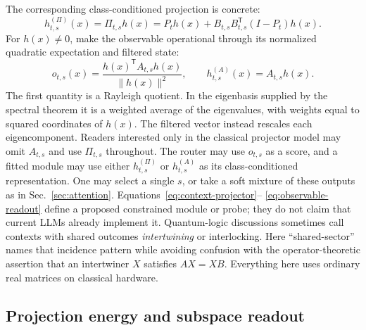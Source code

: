 \documentclass[
  aps,
  reprint,
  superscriptaddress,
  floatfix,
  nofootinbib,
  longbibliography
]{revtex4-2}
\newcommand{\T}{^{\mathsf{T}}}
\newcommand{\norm}[1]{\lVert #1 \rVert}
\begin{document}
The corresponding class-conditioned projection is concrete:
%
\begin{equation}
\label{eq:observable-embedding}
h_{t,s}^{(\Pi)}(x)
=\Pi_{t,s}h(x)
=P_t h(x)+B_{t,s}B_{t,s}\T(I-P_t)h(x).
\end{equation}
%
For $h(x)\ne0$, make the observable operational through its normalized
quadratic expectation and filtered state:
\begin{equation}
\label{eq:observable-readout}
o_{t,s}(x)=
\frac{h(x)\T A_{t,s}h(x)}{\norm{h(x)}^2},
\qquad
h_{t,s}^{(A)}(x)=A_{t,s}h(x).
\end{equation}
The first quantity is a Rayleigh quotient.  In the eigenbasis supplied by the
spectral theorem it is a weighted average of the eigenvalues, with weights
equal to squared coordinates of $h(x)$.  The filtered vector instead rescales
each eigencomponent.  Readers interested only in the classical projector
model may omit $A_{t,s}$ and use $\Pi_{t,s}$ throughout.
The router may use $o_{t,s}$ as a score, and a fitted module may use either
$h_{t,s}^{(\Pi)}$ or $h_{t,s}^{(A)}$ as its class-conditioned representation.
One may select a single $s$, or take a soft mixture of these outputs as in
Sec.~\ref{sec:attention}.  Equations~\eqref{eq:context-projector}--
\eqref{eq:observable-readout} define a proposed constrained module or probe;
they do not claim that current LLMs already implement it.  Quantum-logic
discussions sometimes call contexts with shared outcomes \emph{intertwining}
or interlocking.  Here ``shared-sector'' names that incidence pattern while
avoiding confusion with the operator-theoretic assertion that an intertwiner
$X$ satisfies $AX=XB$.
Everything here uses ordinary real matrices on classical hardware.

\subsection{Projection energy and subspace readout}
\label{sec:gated}
\end{document}
